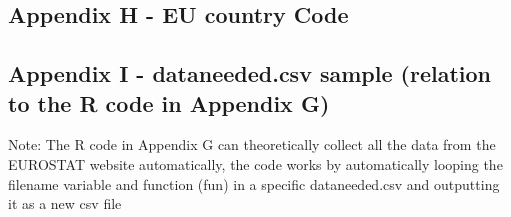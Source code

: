 \documentclass[12pt]{article}
\begin{document}
\newpage


\subsection{Appendix H - EU country Code}


\newpage
\subsection{Appendix I - dataneeded.csv sample (relation to the R code in Appendix G)}
Note: The R code in Appendix G can theoretically collect all the data from the EUROSTAT website automatically, the code works by automatically looping the filename variable and function (fun) in a specific dataneeded.csv and outputting it as a new csv file





\newpage
\end{document}
